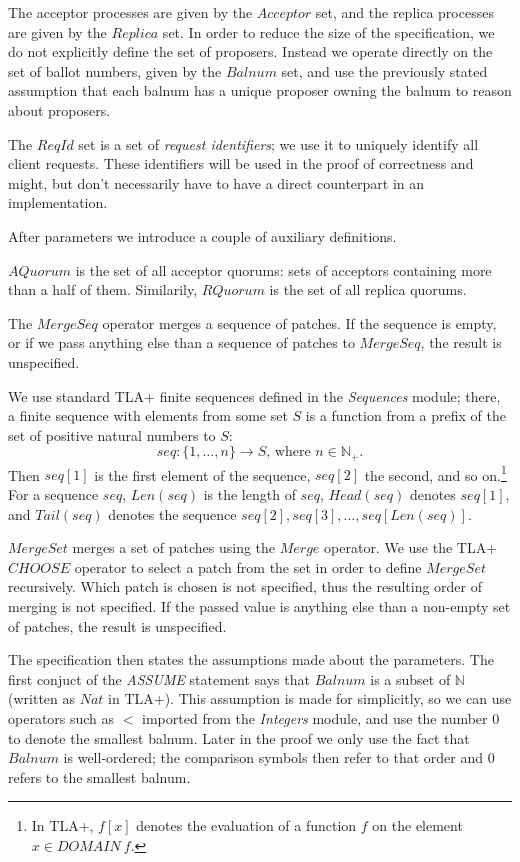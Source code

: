\documentclass[12pt,a4paper,en]{pracamgr}
\newcommand{\ti}[1]{\textit{#1}}
\newcommand{\mbb}[1]{\mathbb{#1}}
\begin{document}
The acceptor processes are given by the $Acceptor$ set, and the replica processes are given by the $Replica$ set. In order to reduce the size of the specification, we do not explicitly define the set of proposers. Instead we operate directly on the set of ballot numbers, given by the $Balnum$ set, and use the previously stated assumption that each balnum has a unique proposer owning the balnum to reason about proposers.

The $ReqId$ set is a set of \ti{request identifiers}; we use it to uniquely identify all client requests. These identifiers will be used in the proof of correctness and might, but don't necessarily have to have a direct counterpart in an implementation.

After parameters we introduce a couple of auxiliary definitions.

$AQuorum$ is the set of all acceptor quorums: sets of acceptors containing more than a half of them. Similarily, $RQuorum$ is the set of all replica quorums. 

The $MergeSeq$ operator merges a sequence of patches. If the sequence is empty, or if we pass anything else than a sequence of patches to $MergeSeq$, the result is unspecified.

We use standard TLA+ finite sequences defined in the \ti{Sequences} module; there, a finite sequence with elements from some set $S$ is a function from a prefix of the set of positive natural numbers to $S$:
$$ seq: \{1, \dots, n\} \rightarrow S\text{, where } n \in \mbb N_+. $$
Then $seq[1]$ is the first element of the sequence, $seq[2]$ the second, and so on.\footnote{In TLA+, $f[x]$ denotes the evaluation of a function $f$ on the element $x \in DOMAIN\ f$.} For a sequence $seq$, $Len(seq)$ is the length of $seq$, $Head(seq)$ denotes $seq[1]$, and $Tail(seq)$ denotes the sequence $seq[2], seq[3], \dots, seq[Len(seq)]$.

$MergeSet$ merges a set of patches using the $Merge$ operator. We use the TLA+ $CHOOSE$ operator to select a patch from the set in order to define $MergeSet$ recursively. Which patch is chosen is not specified, thus the resulting order of merging is not specified. If the passed value is anything else than a non-empty set of patches, the result is unspecified.

The specification then states the assumptions made about the parameters. The first conjuct of the \ti{ASSUME} statement says that $Balnum$ is a subset of $\mbb N$ (written as $Nat$ in TLA+). This assumption is made for simplicitly, so we can use operators such as $<$ imported from the \ti{Integers} module, and use the number $0$ to denote the smallest balnum. Later in the proof we only use the fact that $Balnum$ is well-ordered; the comparison symbols then refer to that order and $0$ refers to the smallest balnum.
\end{document}
